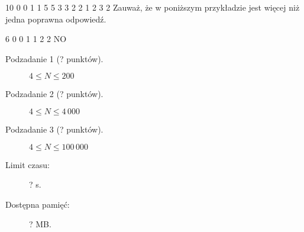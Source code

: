 \documentclass{boi2014-pl}
\begin{document}
    \Examples
	\example
	{
		10  0  0  1  1  5  5  3  3  2  2
	}
	{
		1 2 3 2
	}
	{
        Zauważ, że w poniższym przykładzie jest więcej niż jedna poprawna odpowiedź.
	}

	\example
	{
		6  0  0  1  1  2  2
	}
	{
		NO
	}

    \Scoring

    \begin{description}
        \item[Podzadanie 1 (? punktów).] $4 \le N \le 200$
        \item[Podzadanie 2 (? punktów).] $4 \le N \le 4\, 000$
        \item[Podzadanie 3 (? punktów).] $4 \le N \le 100\, 000$
    \end{description}

    \Constraints

    \begin{description}
        \item[Limit czasu:] ? s.
        \item[Dostępna pamięć:] ? MB.
    \end{description}
\end{document}
